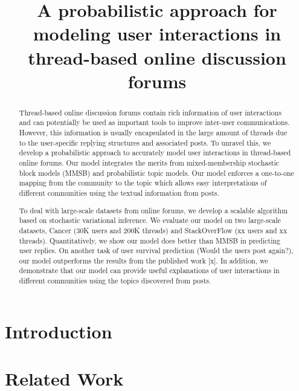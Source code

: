 \documentclass{article}
\title{A probabilistic approach for modeling user interactions in thread-based 
online discussion forums}
\begin{document}
\maketitle
\begin{abstract}

Thread-based online discussion forums contain rich information of user 
interactions and can potentially be used as important tools to improve 
inter-user communications. However, this information is usually encapsulated 
in the large amount of threads due to the user-specific replying structures 
and associated posts. To unravel this, we develop a probabilistic approach 
to accurately model user interactions in thread-based online forums. Our 
model integrates the merits from mixed-membership stochastic block models 
(MMSB) and probabilistic topic models. Our model enforces a one-to-one 
mapping from the community to the topic which allows easy interpretations 
of different communities using the textual information from posts.

To deal with large-scale datasets from online forums, we develop a scalable 
algorithm based on stochastic variational inference.  We evaluate our model 
on two large-scale datasets, Cancer (30K users and 200K threads) and 
StackOverFlow (xx users and xx threads). Quantitatively, we show our 
model does better than MMSB in predicting user replies. On another task 
of user survival prediction (Would the users post again?), our model 
outperforms the results from the published work [x]. In addition, we 
demonstrate that our model can provide useful explanations of user 
interactions in different communities using the topics discovered from posts.







\end{abstract}

\section{Introduction}


\section{Related Work}


\end{document}
